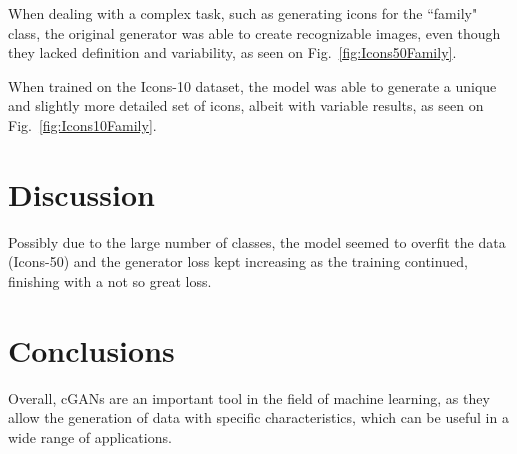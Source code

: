 \documentclass[conference]{IEEEtran}
\begin{document}
When dealing with a complex task, such as generating icons for the ``family" class, the original generator was able to create recognizable images, even though they lacked definition and variability, as seen on Fig.~\ref{fig:Icons50Family}. 

When trained on the Icons-10 dataset, the model was able to generate a unique and slightly more detailed set of icons, albeit with variable results, as seen on Fig.~\ref{fig:Icons10Family}.

\section{Discussion}

 Possibly due to the large number of classes, the model seemed to overfit the data (Icons-50) and the generator loss kept increasing as the training continued, finishing with a not so great loss.
 
\section{Conclusions}
Overall, cGANs are an important tool in the field of machine learning, as they allow the generation of data with specific characteristics, which can be useful in a wide range of applications.



\end{document}
